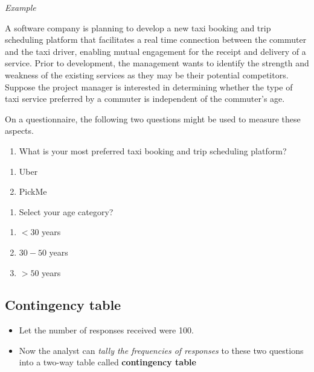 \documentclass[]{book}
\providecommand{\tightlist}{%
  \setlength{\itemsep}{0pt}\setlength{\parskip}{0pt}}
\begin{document}
\emph{Example}

A software company is planning to develop a new taxi booking and trip scheduling platform that facilitates a real time connection between the commuter and the taxi driver, enabling mutual engagement for the receipt and delivery of a service. Prior to development, the management wants to identify the strength and weakness of the existing services as they may be their potential competitors. Suppose the project manager is interested in determining whether the type of taxi service preferred by a commuter is independent of the commuter's age.

On a questionnaire, the following two questions might be used to measure these aspects.

\begin{enumerate}
\def\labelenumi{\arabic{enumi}.}
\tightlist
\item
  What is your most preferred taxi booking and trip scheduling platform?
\end{enumerate}

\begin{enumerate}
\def\labelenumi{\alph{enumi})}
\tightlist
\item
  Uber
\item
  PickMe
\end{enumerate}

\begin{enumerate}
\def\labelenumi{\arabic{enumi}.}
\setcounter{enumi}{1}
\tightlist
\item
  Select your age category?
\end{enumerate}

\begin{enumerate}
\def\labelenumi{\alph{enumi})}
\tightlist
\item
  \(< 30\) years
\item
  \(30-50\) years
\item
  \(>50\) years
\end{enumerate}

\hypertarget{contingency-table}{%
\subsection{Contingency table}\label{contingency-table}}

\begin{itemize}
\item
  Let the number of responses received were 100.
\item
  Now the analyst can \emph{tally the frequencies of responses} to these two questions into a two-way table called \textbf{contingency table}
\end{itemize}
\end{document}
